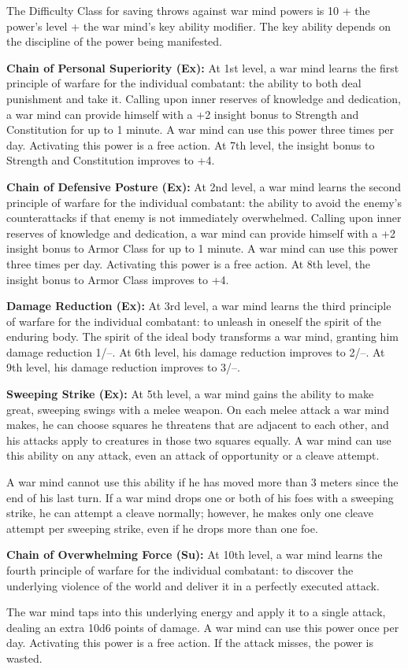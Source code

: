 {The Difficulty Class for saving throws against war mind powers is 10 + the power's level + the war mind's key ability modifier. The key ability depends on the discipline of the power being manifested.

\textbf{Chain of Personal Superiority (Ex):} At 1st level, a war mind learns the first principle of warfare for the individual combatant: the ability to both deal punishment and take it. Calling upon inner reserves of knowledge and dedication, a war mind can provide himself with a +2 insight bonus to Strength and Constitution for up to 1 minute. A war mind can use this power three times per day. Activating this power is a free action. At 7th level, the insight bonus to Strength and Constitution improves to +4.

\textbf{Chain of Defensive Posture (Ex):} At 2nd level, a war mind learns the second principle of warfare for the individual combatant: the ability to avoid the enemy's counterattacks if that enemy is not immediately overwhelmed. Calling upon inner reserves of knowledge and dedication, a war mind can provide himself with a +2 insight bonus to Armor Class for up to 1 minute. A war mind can use this power three times per day. Activating this power is a free action. At 8th level, the insight bonus to Armor Class improves to +4.

\textbf{Damage Reduction (Ex):} At 3rd level, a war mind learns the third principle of warfare for the individual combatant: to unleash in oneself the spirit of the enduring body. The spirit of the ideal body transforms a war mind, granting him damage reduction 1/--. At 6th level, his damage reduction improves to 2/--. At 9th level, his damage reduction improves to 3/--.

\textbf{Sweeping Strike (Ex):} At 5th level, a war mind gains the ability to make great, sweeping swings with a melee weapon. On each melee attack a war mind makes, he can choose squares he threatens that are adjacent to each other, and his attacks apply to creatures in those two squares equally. A war mind can use this ability on any attack, even an attack of opportunity or a cleave attempt.

A war mind cannot use this ability if he has moved more than 3 meters since the end of his last turn. If a war mind drops one or both of his foes with a sweeping strike, he can attempt a cleave normally; however, he makes only one cleave attempt per sweeping strike, even if he drops more than one foe.

\textbf{Chain of Overwhelming Force (Su):} At 10th level, a war mind learns the fourth principle of warfare for the individual combatant: to discover the underlying violence of the world and deliver it in a perfectly executed attack.

The war mind taps into this underlying energy and apply it to a single attack, dealing an extra 10d6 points of damage. A war mind can use this power once per day. Activating this power is a free action. If the attack misses, the power is wasted.
}
